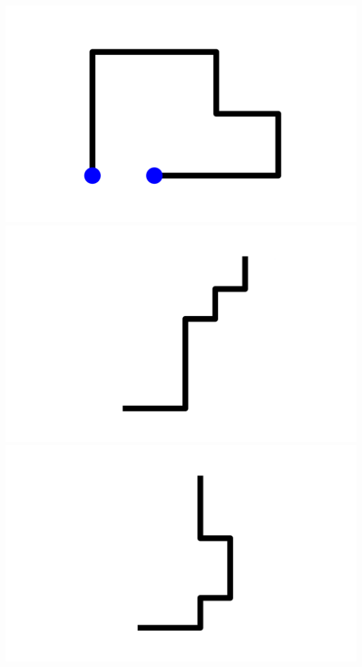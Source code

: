 \documentclass[]{report}
\begin{document}
\includegraphics[scale=.1]{pictures/21/state_cluster_shapes_139.pdf} 
\includegraphics[scale=.1]{pictures/21/state_cluster_shapes_140.pdf} 
\includegraphics[scale=.1]{pictures/21/state_cluster_shapes_141.pdf} 
\end{document}
